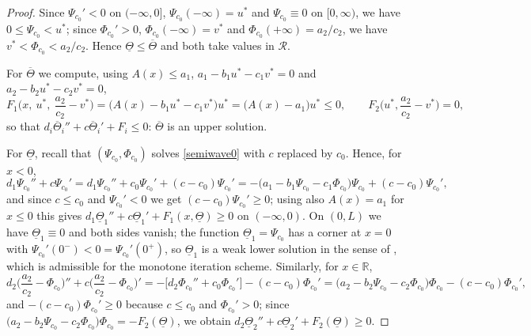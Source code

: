 \documentclass[reqno]{amsart}
\theoremstyle{plain}
\theoremstyle{definition}
\theoremstyle{remark}
\begin{document}
\begin{proof}
	Since $\Psi_{c_0}'<0$ on $(-\infty,0]$, $\Psi_{c_0}(-\infty)=u^*$ and
	$\Psi_{c_0}\equiv0$ on $[0,\infty)$, we have $0\le\Psi_{c_0}<u^*$; since
	$\Phi_{c_0}'>0$, $\Phi_{c_0}(-\infty)=v^*$ and $\Phi_{c_0}(+\infty)=a_2/c_2$,
	we have $v^*<\Phi_{c_0}<a_2/c_2$. Hence
	$\underline\Theta\le\overline\Theta$ and both take values in $\mathcal R$.

	For $\overline\Theta$ we compute, using $A(x)\le a_1$,
	$a_1-b_1u^*-c_1v^*=0$ and $a_2-b_2u^*-c_2v^*=0$,
	\[
	F_1\Big(x,\ u^*,\ \frac{a_2}{c_2}-v^*\Big)=\big(A(x)-b_1u^*-c_1v^*\big)u^*
	=\big(A(x)-a_1\big)u^*\le0,
	\qquad F_2\Big(u^*,\frac{a_2}{c_2}-v^*\Big)=0 ,
	\]
	so that $d_i\overline\Theta_i''+c\overline\Theta_i'+F_i\le0$: $\overline\Theta$
	is an upper solution.

	For $\underline\Theta$, recall that $(\Psi_{c_0},\Phi_{c_0})$ solves
	\eqref{semiwave0} with $c$ replaced by $c_0$. Hence, for $x<0$,
	\[
	d_1\Psi_{c_0}''+c\Psi_{c_0}'
	= d_1\Psi_{c_0}''+c_0\Psi_{c_0}'+(c-c_0)\Psi_{c_0}'
	= -\big(a_1-b_1\Psi_{c_0}-c_1\Phi_{c_0}\big)\Psi_{c_0}+(c-c_0)\Psi_{c_0}' ,
	\]
	and since $c\le c_0$ and $\Psi_{c_0}'<0$ we get $(c-c_0)\Psi_{c_0}'\ge0$;
	using also $A(x)=a_1$ for $x\le0$ this gives
	$d_1\underline\Theta_1''+c\underline\Theta_1'+F_1(x,\underline\Theta)\ge0$
	on $(-\infty,0)$. On $(0,L)$ we have $\underline\Theta_1\equiv0$ and both
	sides vanish; the function $\underline\Theta_1=\Psi_{c_0}$ has a corner at
	$x=0$ with $\Psi_{c_0}'(0^-)<0=\Psi_{c_0}'(0^+)$, so $\underline\Theta_1$ is a
	weak lower solution in the sense of \cite[Definition 2.4]{MR3986328}, which is
	admissible for the monotone iteration scheme. Similarly, for $x\in \mathbb{R}$,
	\[
	d_2\Big(\frac{a_2}{c_2}-\Phi_{c_0}\Big)''+c\Big(\frac{a_2}{c_2}-\Phi_{c_0}\Big)'
	= -\big[d_2\Phi_{c_0}''+c_0\Phi_{c_0}'\big]-(c-c_0)\Phi_{c_0}'
	= \big(a_2-b_2\Psi_{c_0}-c_2\Phi_{c_0}\big)\Phi_{c_0}-(c-c_0)\Phi_{c_0}' ,
	\]
	and $-(c-c_0)\Phi_{c_0}'\ge0$ because $c\le c_0$ and $\Phi_{c_0}'>0$; since
	$\big(a_2-b_2\Psi_{c_0}-c_2\Phi_{c_0}\big)\Phi_{c_0}
	=-F_2(\underline\Theta)$, we obtain
	$d_2\underline\Theta_2''+c\underline\Theta_2'+F_2(\underline\Theta)\ge0$.
\end{proof}
\end{document}
